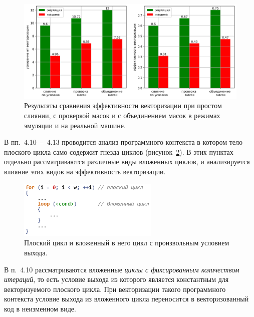 \documentclass[a4paper,14pt]{extarticle}                     %
\theoremstyle{plain}                                         %
\begin{document}
\begin{figure}[!ht]
\centering
\includegraphics[width=1.0\textwidth]{./pics/text_4_vec_comb_mask/res.png}
\singlespacing
{}\caption{Результаты сравнения эффективности векторизации при простом слиянии, с проверкой масок и с объединением масок в режимах эмуляции и на реальной машине.}
\label{fig:text_4_vec_comb_mask_res}
\end{figure}


В пп.~4.10~--~4.13 проводится анализ программного контекста в котором тело плоского цикла само содержит гнезда циклов (рисунок~\ref{fig:text_4_vec_flat_loop_vec}).
В этих пунктах отдельно рассматриваются различные виды вложенных циклов, и анализируется влияние этих видов на эффективность векторизации.

\begin{figure}[!ht]
\centering
\includegraphics[width=0.6\textwidth]{./pics/text_4_vec_riemann/flat_loop_nest.pdf}
\singlespacing
{}\caption{Плоский цикл и вложенный в него цикл с произвольным условием выхода.}
\label{fig:text_4_vec_flat_loop_vec}
\end{figure}

В п.~4.10 рассматриваются вложенные \textit{циклы с фиксированным количеством итераций}, то есть условие выхода из которого является константным для векторизуемого плоского цикла.
При векторизации такого программного контекста условие выхода из вложенного цикла переносится в векторизованный код в неизменном виде.
\end{document}
